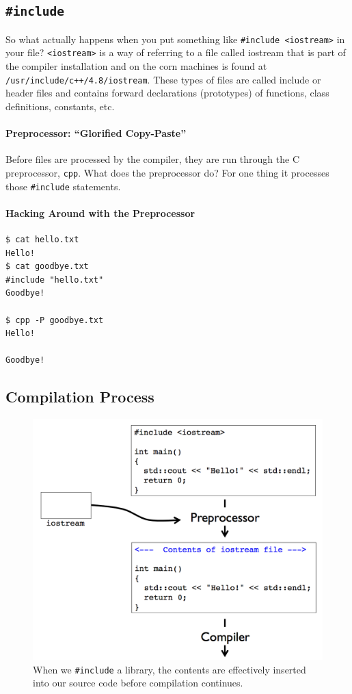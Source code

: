 \documentclass[12pt,letterpaper,twoside]{article}
\begin{document}
\subsection{\texorpdfstring{\texttt{\#include}}{\#include}}
So what actually happens when you put something like
\texttt{\#include\ \textless{}iostream\textgreater{}} in your file?
\texttt{\textless{}iostream\textgreater{}} is a way of referring to a
file called iostream that is part of the compiler installation and on
the corn machines is found at \texttt{/usr/include/c++/4.8/iostream}.
These types of files are called include or header files and contains
forward declarations (prototypes) of functions, class definitions,
constants, etc.

\paragraph{Preprocessor: ``Glorified Copy-Paste''}
Before files are processed by the compiler, they are run through the C
preprocessor, \texttt{cpp}.
What does the preprocessor do?
For one thing it processes those \texttt{\#include} statements.

\paragraph{Hacking Around with the Preprocessor}
\begin{verbatim}
$ cat hello.txt 
Hello!
$ cat goodbye.txt 
#include "hello.txt"
Goodbye!

$ cpp -P goodbye.txt 
Hello!

Goodbye!
\end{verbatim}

\subsection{Compilation Process}
\begin{figure}[h]
\centering
\includegraphics[scale=0.5]{fig/compilation.png}
\caption{\footnotesize When we \texttt{\#include} a library, the contents are effectively inserted
into our source code before compilation continues.}
\end{figure}
\end{document}
